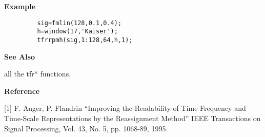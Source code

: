 
{\bf \large {}\selectfont Example}
\begin{verbatim}
         sig=fmlin(128,0.1,0.4); 
         h=window(17,'Kaiser'); 
         tfrrpmh(sig,1:128,64,h,1);
\end{verbatim}
\vspace*{.5cm}

{\bf \large {}\selectfont See Also}\\
\hspace*{1.5cm}
\begin{minipage}[t]{13.5cm}
all the {\ty tfr*} functions.
\end{minipage}
\vspace*{.5cm}


{\bf \large {}\selectfont Reference}\\
\hspace*{1.5cm}
\begin{minipage}[t]{13.5cm}
[1] F. Auger, P. Flandrin ``Improving the Readability of Time-Frequency and
Time-Scale Representations by the Reassignment Method'' IEEE Transactions
on Signal Processing, Vol. 43, No. 5, pp. 1068-89, 1995.
\end{minipage}

